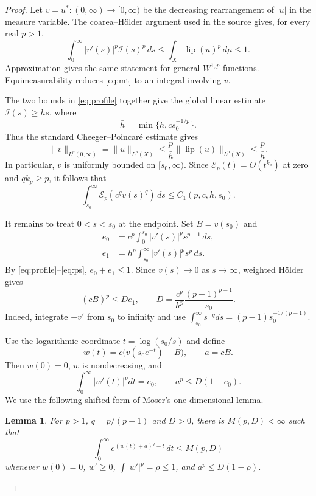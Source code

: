 \documentclass[11pt]{article}
\newtheorem{lemma}{Lemma}
\newcommand{\lip}{\operatorname{lip}}
\newcommand{\I}{\mathcal I}
\begin{document}
\begin{proof}
Let $v=u^*:(0,\infty)\to[0,\infty)$ be the decreasing rearrangement of $|u|$ in the measure variable.  The coarea--H\"older argument used in the source gives, for every real $p>1$,
\begin{equation}\label{eq:ps}
 \int_0^\infty |v'(s)|^p\I(s)^p\,ds
 \leq\int_X\lip(u)^p\,d\mu\leq1.
\end{equation}
Approximation gives the same statement for general $W^{1,p}$ functions.  Equimeasurability reduces \eqref{eq:mt} to an integral involving $v$.

The two bounds in \eqref{eq:profile} together give the global linear estimate
$\I(s)\geq \bar h s$, where
\[
 \bar h=\min\{h,c s_0^{-1/p}\}.
\]
Thus the standard Cheeger--Poincar\'e estimate gives
\[
 \|v\|_{L^p(0,\infty)}=\|u\|_{L^p(X)}
 \leq\frac{p}{\bar h}\|\lip(u)\|_{L^p(X)}\leq\frac p{\bar h}.
\]
In particular, $v$ is uniformly bounded on $[s_0,\infty)$.  Since $\mathcal E_p(t)=O(t^{k_p})$ at zero and $qk_p\geq p$, it follows that
\begin{equation}\label{eq:large}
 \int_{s_0}^\infty\mathcal E_p(c^qv(s)^q)\,ds\leq C_1(p,c,h,s_0).
\end{equation}

It remains to treat $0<s<s_0$ at the endpoint.  Set $B=v(s_0)$ and
\begin{align*}
 e_0&=c^p\int_0^{s_0}|v'(s)|^ps^{p-1}\,ds,\\
 e_1&=h^p\int_{s_0}^{\infty}|v'(s)|^ps^p\,ds.
\end{align*}
By \eqref{eq:profile}--\eqref{eq:ps}, $e_0+e_1\leq1$.  Since $v(s)\to0$ as $s\to\infty$, weighted H\"older gives
\begin{equation}\label{eq:tail}
 (cB)^p\leq
 D e_1,\qquad
 D=\frac{c^p}{h^p}\frac{(p-1)^{p-1}}{s_0}.
\end{equation}
Indeed, integrate $-v'$ from $s_0$ to infinity and use
$\int_{s_0}^\infty s^{-q}ds=(p-1)s_0^{-1/(p-1)}$.

Use the logarithmic coordinate $t=\log(s_0/s)$ and define
\[
 w(t)=c\bigl(v(s_0e^{-t})-B\bigr),\qquad a=cB.
\]
Then $w(0)=0$, $w$ is nondecreasing, and
\[
 \int_0^\infty |w'(t)|^pdt=e_0,\qquad
 a^p\leq D(1-e_0).
\]
We use the following shifted form of Moser's one-dimensional lemma.

\begin{lemma}\label{lem:shift}
For $p>1$, $q=p/(p-1)$ and $D>0$, there is $M(p,D)<\infty$ such that
\[
 \int_0^\infty e^{(w(t)+a)^q-t}\,dt\leq M(p,D)
\]
whenever $w(0)=0$, $w'\geq0$, $\int|w'|^p=\rho\leq1$, and $a^p\leq D(1-\rho)$.
\end{lemma}


\end{proof}
\end{document}
